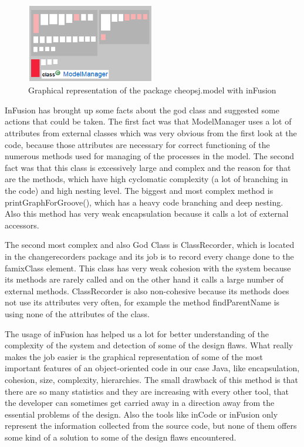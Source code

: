 \documentclass{article}
\begin{document}
\begin{figure}[h]
\centering
\includegraphics[width=0.5\textwidth]{Images/GodClassMM}
\caption{Graphical representation of the package cheopsj.model with inFusion}
\label{fig:godClassMM}
\end{figure}

InFusion has brought up some facts about the god class and suggested some actions that could be taken. The first fact was that ModelManager uses a lot of attributes from external classes which was very obvious from the first look at the code, because those attributes are necessary for correct functioning of the numerous methods used for managing of the processes in the model. The second fact was that this class is excessively large and complex and the reason for that are the methods, which have high cyclomatic complexity (a lot of branching in the code) and high nesting level. The biggest and most complex method is printGraphForGroove(), which has a heavy code branching and deep nesting. Also this method has very weak encapsulation because it calls a lot of external accessors.

The second most complex and also God Class is ClassRecorder, which is located in the changerecorders package and its job is to record every change done to the famixClass element. This class has very weak cohesion with the system because its methods are rarely called and on the other hand it calls a large number of external methods. ClassRecorder is also non-cohesive because its methods does not use its attributes very often, for example the method findParentName is using none of the attributes of the class.

The usage of inFusion has helped us a lot for better understanding of the complexity of the system and detection of some of the design flaws. What really makes the job easier is the graphical representation of some of the most important features of an object-oriented code in our case Java, like encapsulation, cohesion, size, complexity, hierarchies. The small drawback of this method is that there are so many statistics and they are increasing with every other tool, that the developer can sometimes get carried away in a direction away from the essential problems of the design. Also the tools like inCode or inFusion only represent the information collected from the source code, but none of them offers some kind of a solution to some of the design flaws encountered.
\end{document}
